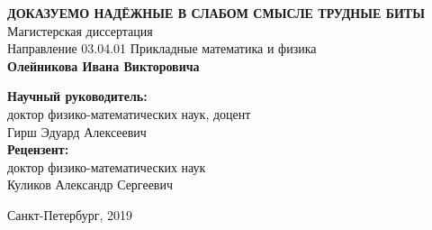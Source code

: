 \begin{titlepage}

\begin{center}
\end{center}

\vspace{2cm}
\begin{center}
  \MakeUppercase{\textbf{Доказуемо надёжные в слабом смысле трудные биты}}
  \\
  Магистерская диссертация
  \\[1cm]
  Направление 03.04.01 Прикладные математика и физика
  \\[1cm]
  {\fontsize{18}{21.6}\selectfont
    \textbf{Олейникова Ивана Викторовича}
  }
  \\[2cm]
\end{center}

\hfill
\begin{minipage}{0.6\textwidth}
\textbf{Научный руководитель:} \\
доктор физико-математических наук, доцент \\
Гирш Эдуард Алексеевич \\[0.5cm]
\textbf{Рецензент:} \\
доктор физико-математических наук \\
Куликов Александр Сергеевич
\end{minipage}

\begin{center}
\mbox{}
\vfill
Санкт-Петербург, 2019
\end{center}

\end{titlepage}
\newpage
